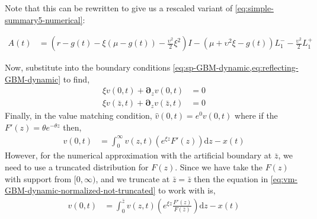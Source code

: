 \documentclass[11pt]{article}
\newcommand{\D}[1][]{\ensuremath{\boldsymbol{\partial}_{#1}}}
\newcommand{\diff}{\ensuremath{\mathrm{d}}}
\begin{document}
Note that this can be rewritten to give us a rescaled variant of \cref{eq:simple-summary5-numerical}:

\begin{align}
	A(t) &= \left(r - g(t)- \xi(\mu-g(t)) - \frac{\upsilon^2}{2}\xi^2\right)I - (\mu+ \upsilon^2\xi - g(t)) L_1^{-} - \frac{\upsilon^2}{2} L_1^{+}
\end{align}

Now, substitute into the boundary conditions \cref{eq:sp-GBM-dynamic,eq:reflecting-GBM-dynamic} to find,
\begin{align}
	\xi v(0,t) + \D[z]v(0,t ) &= 0\label{eq:new-BC1}\\
	\xi v(\bar{z},t) + \D[z]v(\bar{z},t) &= 0\label{eq:new-BC2}
\end{align}
Finally, in the value matching condition, $\hat{v}(0,t) = e^{0} v(0,t)$ where if the $F'(z) = \theta e^{-\theta z}$ then,
\begin{align}
	 v(0,t) &= \int_{0}^{\infty}  v(z,t) \left(e^{\xi z} F'(z)\right) \diff z - x(t)\label{eq:vm-GBM-dynamic-normalized-not-truncated}
\end{align}
However, for the numerical approximation with the artificial boundary at $\bar{z}$, we need to use a truncated distribution for $F(z)$.  Since we have take the $F(z)$ with support from $[0,\infty)$, and we truncate at $\bar{z} = \bar{z}$ then the equation in \cref{eq:vm-GBM-dynamic-normalized-not-truncated} to work with is,
\begin{align}
	 v(0,t) &= \int_{0}^{\bar{z}}  v(z,t) \left(e^{\xi z} \frac{F'(z)}{F(\bar{z})}\right) \diff z - x(t)\label{eq:vm-GBM-dynamic-normalized}
\end{align}
\end{document}
